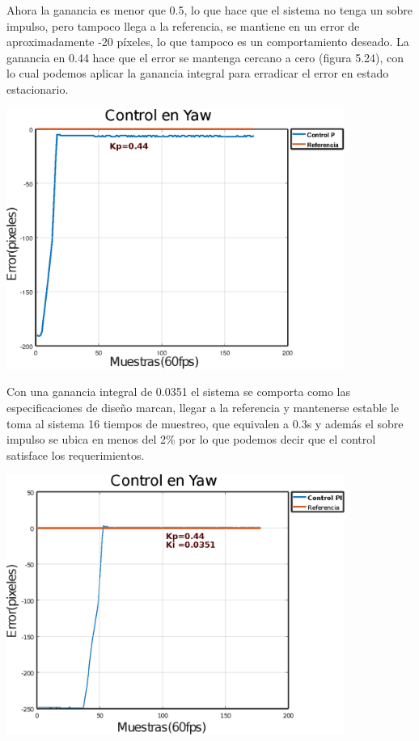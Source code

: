 Ahora la ganancia es menor que 0.5, lo que hace que el sistema no tenga un sobre impulso, pero tampoco llega
a la referencia, se mantiene en un error de aproximadamente -20 píxeles, lo que tampoco es un comportamiento deseado.
La ganancia en 0.44 hace que el error se mantenga cercano a cero (figura 5.24), con lo cual podemos aplicar la ganancia integral para erradicar el error en estado estacionario. 
\begin{center}
	\includegraphics[width=0.83\textwidth]{Contenido/Cuerpo/Capitulo5/Fig32.eps}
	\label{Fig4}
\end{center}
Con una ganancia integral de 0.0351 el sistema se comporta como las especificaciones de diseño marcan, llegar a la referencia y mantenerse estable le toma al sistema 16 tiempos de
muestreo, que equivalen a 0.3s y además el sobre impulso se ubica en menos del 2\% por lo que podemos decir que el control satisface los requerimientos.
\begin{center}
	\includegraphics[width=0.83\textwidth]{Contenido/Cuerpo/Capitulo5/Fig33.eps}
	\label{Fig4}
\end{center}